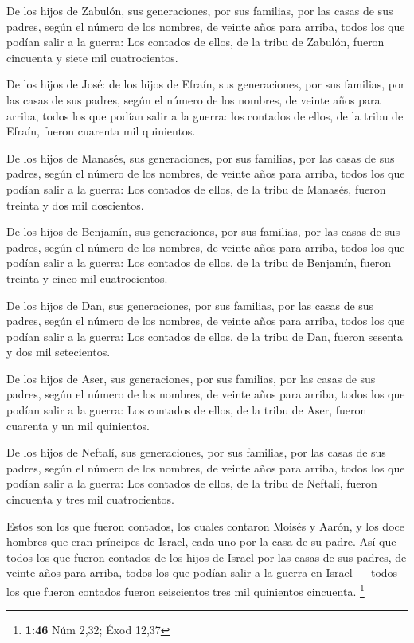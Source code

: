 \begin{paracol}{2}
 De los hijos de Zabulón, sus generaciones, por sus
familias, por las casas de sus padres, según el número de los nombres,
de veinte años para arriba, todos los que podían salir a la guerra:
 Los contados de ellos, de la tribu de Zabulón, fueron
cincuenta y siete mil cuatrocientos.

 De los hijos de José: de los hijos de Efraín, sus
generaciones, por sus familias, por las casas de sus padres, según el
número de los nombres, de veinte años para arriba, todos los que podían
salir a la guerra:  los contados de ellos, de la tribu de
Efraín, fueron cuarenta mil quinientos.

 De los hijos de Manasés, sus generaciones, por sus
familias, por las casas de sus padres, según el número de los nombres,
de veinte años para arriba, todos los que podían salir a la guerra:
 Los contados de ellos, de la tribu de Manasés, fueron
treinta y dos mil doscientos.

 De los hijos de Benjamín, sus generaciones, por sus
familias, por las casas de sus padres, según el número de los nombres,
de veinte años para arriba, todos los que podían salir a la guerra:
 Los contados de ellos, de la tribu de Benjamín, fueron
treinta y cinco mil cuatrocientos.

 De los hijos de Dan, sus generaciones, por sus familias,
por las casas de sus padres, según el número de los nombres, de veinte
años para arriba, todos los que podían salir a la guerra:
 Los contados de ellos, de la tribu de Dan, fueron
sesenta y dos mil setecientos.

 De los hijos de Aser, sus generaciones, por sus
familias, por las casas de sus padres, según el número de los nombres,
de veinte años para arriba, todos los que podían salir a la guerra:
 Los contados de ellos, de la tribu de Aser, fueron
cuarenta y un mil quinientos.

 De los hijos de Neftalí, sus generaciones, por sus
familias, por las casas de sus padres, según el número de los nombres,
de veinte años para arriba, todos los que podían salir a la guerra:
 Los contados de ellos, de la tribu de Neftalí, fueron
cincuenta y tres mil cuatrocientos.

 Estos son los que fueron contados, los cuales contaron
Moisés y Aarón, y los doce hombres que eran príncipes de Israel, cada
uno por la casa de su padre.  Así que todos los que
fueron contados de los hijos de Israel por las casas de sus padres, de
veinte años para arriba, todos los que podían salir a la guerra en
Israel ---  todos los que fueron contados fueron
seiscientos tres mil quinientos cincuenta. \footnote{\textbf{1:46} Núm
  2,32; Éxod 12,37}


\end{paracol}
